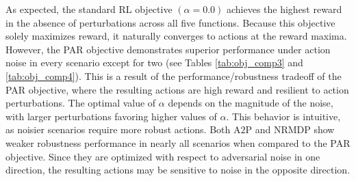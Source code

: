 \documentclass[./dissertation.tex]{subfiles}
\begin{document}
As expected, the standard RL objective $(\alpha=0.0)$ achieves the highest reward in the absence of perturbations across all five functions. Because this objective solely maximizes reward, it naturally converges to actions at the reward maxima. However, the PAR objective demonstrates superior performance under action noise in every scenario except for two (see Tables \ref{tab:obj_comp3} and \ref{tab:obj_comp4}). This is a result of the performance/robustness tradeoff of the PAR objective, where the resulting actions are high reward and resilient to action perturbations. The optimal value of $\alpha$ depends on the magnitude of the noise, with larger perturbations favoring higher values of $\alpha$. This behavior is intuitive, as noisier scenarios require more robust actions. Both A$2$P and NRMDP show weaker robustness performance in nearly all scenarios when compared to the PAR objective. Since they are optimized with respect to adversarial noise in one direction, the resulting actions may be sensitive to noise in the opposite direction.
\end{document}
